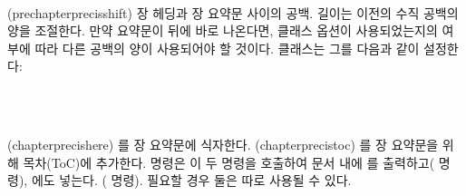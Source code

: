 \begin{syntax}
\lnc{\prechapterprecisshift} \\
\end{syntax}
\glossary(prechapterprecisshift)%
  {}%
  {장 헤딩과 장 요약문 사이의 공백.}
\lnc{\prechapterprecisshift} 길이는 \cmd{\chapterprecis} 이전의 수직 공백의 양을 조절한다.
만약 요약문이 \cmd{\chapter} 뒤에 바로 나온다면,
 클래스 옵션이 사용되었는지의 여부에 따라
다른 공백의 양이 사용되어야 할 것이다.
클래스는 그를 다음과 같이 설정한다:
\begin{lcode}
\ifartopt
  \setlength{\prechapterprecisshift}{0pt}
\else
  \setlength{\prechapterprecisshift}{-2\baselineskip}
\fi
\end{lcode}


\begin{syntax}
\cmd{\chapterprecishere} \\
\cmd{\chapterprecistoc} \\
\end{syntax}
\glossary(chapterprecishere)%
  {}%
  {를 장 요약문에 식자한다.}
\glossary(chapterprecistoc)%
  {}%
  {를 장 요약문을 위해 목차(ToC)에 추가한다.}
\cmd{\chapterprecis} 명령은 이 두 명령을 호출하여
문서 내에 를 출력하고(\cmd{\chapterprecishere} 명령),
\toc{} 에도 넣는다. (\cmd{\chapterprecistoc} 명령). 
필요할 경우 둘은 따로 사용될 수 있다.

